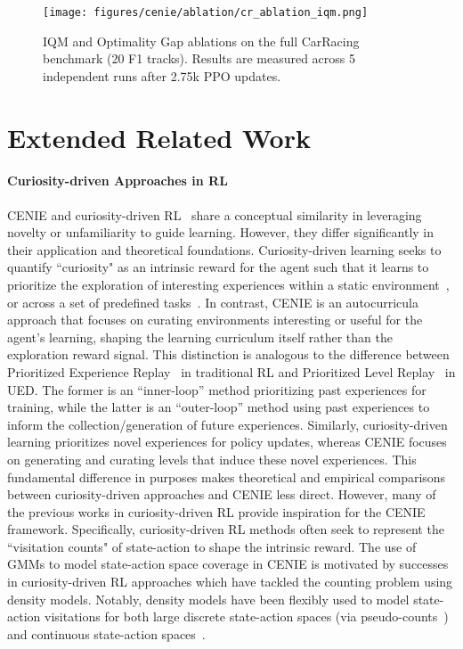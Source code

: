 \begin{figure}[ht]
  \centering
  \texttt{[image: figures/cenie/ablation/cr\_ablation\_iqm.png]}
  \caption{IQM and Optimality Gap ablations on the full CarRacing benchmark (20 F1 tracks). Results are measured across 5 independent runs after 2.75k PPO updates.}
  \label{fig:car_racing_abaltion_iqm}
\end{figure}

\section{Extended Related Work} \label{section:extended_related_work}
\paragraph{Curiosity-driven Approaches in RL} CENIE and curiosity-driven RL~\cite{schmidhuber1991,singh2010} share a conceptual similarity in leveraging novelty or unfamiliarity to guide learning. However, they differ significantly in their application and theoretical foundations. Curiosity-driven learning seeks to quantify ``curiosity" as an intrinsic reward for the agent such that it learns to prioritize the exploration of interesting experiences within a static environment~\cite{pathak2017curiosity}, or across a set of predefined tasks~\cite{burda2018large}. In contrast, CENIE is an autocurricula approach that focuses on curating environments interesting or useful for the agent's learning, shaping the learning curriculum itself rather than the exploration reward signal. This distinction is analogous to the difference between Prioritized Experience Replay~\cite{schaul2015prioritized} in traditional RL and Prioritized Level Replay~\cite{jiang2021prioritized} in UED. The former is an ``inner-loop'' method prioritizing past experiences for training, while the latter is an ``outer-loop'' method using past experiences to inform the collection/generation of future experiences. Similarly, curiosity-driven learning prioritizes novel experiences for policy updates, whereas CENIE focuses on generating and curating levels that induce these novel experiences. This fundamental difference in purposes makes theoretical and empirical comparisons between curiosity-driven approaches and CENIE less direct. However, many of the previous works in curiosity-driven RL provide inspiration for the CENIE framework. Specifically, curiosity-driven RL methods often seek to represent the ``visitation counts" of state-action to shape the intrinsic reward. The use of GMMs to model state-action space coverage in CENIE is motivated by successes in curiosity-driven RL approaches which have tackled the counting problem using density models. Notably, density models have been flexibly used to model state-action visitations for both large discrete state-action spaces (via pseudo-counts~\cite{bellemare2016,ostrovski2017count}) and continuous state-action spaces~\cite{zhao2019maximum,zhao2020curiositydriven}.


